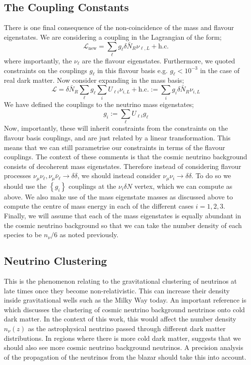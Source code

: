 \documentclass[11pt]{article}
\numberwithin{equation}{section}
\numberwithin{figure}{section}
\numberwithin{table}{section}
\newcommand{\mL}{\mathcal{L}}
\newcommand{\set}[1]{\left\{#1\right\}}
\begin{document}
\subsection{The Coupling Constants}


There is one final consequence of the non-coincidence of the mass and flavour eigenstates. We are considering a coupling in the Lagrangian of the form;
\begin{equation}
  \mL_{\textrm{new}} = \sum_{\ell}{g_\ell \delta \bar{N}_R \nu_{\ell, L} + \textrm{h.c.}}
\end{equation}
where importantly, the $\nu_{\ell}$ are the flavour eigenstates. Furthermore, we quoted constraints on the couplings $g_\ell$ in this flavour basis e.g. $g_{\ell} < 10^{-3}$ in the case of real dark matter. Now consider expanding in the mass basis;
\begin{equation}
  \mL = \delta \bar{N}_R \sum_{\ell}{g_\ell \sum_{i}{U_{\ell i}\nu_{i, L}}} + \textrm{h.c.} := \sum_i{g_i \delta \bar{N}_R \nu_{i, L}}
\end{equation}
We have defined the couplings to the neutrino mass eigenstates;
\begin{equation}
  g_i := \sum_{\ell}{U_{\ell i}g_{\ell}}
\end{equation}
Now, importantly, these will inherit constraints from the constraints on the flavour basis couplings, and are just related by a linear transformation. This means that we can still parametrise our constraints in terms of the flavour couplings. The context of these comments is that the cosmic neutrino background consists of decoherent mass eigenstates. Therefore instead of considering flavour processes $\nu_\mu \nu_\ell, \nu_\mu \bar{\nu}_\ell \rightarrow \delta\delta$, we should instead consider $\nu_\mu \nu_i \rightarrow \delta \delta$. To do so we should use the $\set{g_i}$ couplings at the $\nu_i \delta N$ vertex, which we can compute as above. We also make use of the mass eigenstate masses as discussed above to compute the centre of mass energy in each of the different cases $i = 1,2,3$. Finally, we will assume that each of the mass eigenstates is equally abundant in the cosmic neutrino background so that we can take the number density of each species to be $n_\nu/6$ as noted previously.

\subsection{Neutrino Clustering}


This is the phenomenon relating to the gravitational clustering of neutrinos at late times once they become non-relativistic. This can increase their density inside gravitational wells such as the Milky Way today.  An important reference is \cite{Ringwald2004} which discusses the clustering of cosmic neutrino background neutrinos onto cold dark matter. In the context of this work, this would affect the number density $n_\nu(z)$ as the astrophysical neutrino passed through different dark matter distributions. In regions where there is more cold dark matter, \cite{Ringwald2004} suggests that we should also see more cosmic neutrino background neutrinos. A precision analysis of the propagation of the neutrinos from the blazar should take this into account.
\end{document}
